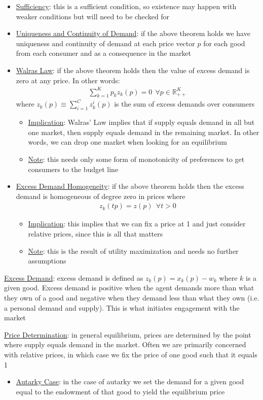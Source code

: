 \documentclass{article}
\begin{document}
  \begin{itemize}
    \item  \underline{Sufficiency}: this is a sufficient condition, so existence may happen with weaker conditions but will need to be checked for
    \item  \underline{Uniqueness and Continuity of Demand}: if the above theorem holds we have uniqueness and continuity of demand at each price vector $p$ for each good from each consumer and as a consequence in the market
    \item  \underline{Walras Law}: if the above theorem holds then the value of excess demand is zero at any price. In other words:
    \begin{gather*}
      \sum_{k=1}^{K} p_{k}z_{k}(p) = 0 \ \ \forall p \in \mathbb{R}_{++}^{K}
    \end{gather*}
    where $z_{k}(p) \equiv \sum_{i=1}^{C}z_{k}^{i}(p)$ is the sum of excess demands over consumers
    \begin{itemize}
      \item  \underline{Implication}: Walras' Law implies that if supply equals demand in all but one market, then supply equals demand in the remaining market. In other words, we can drop one market when looking for an equilibrium
      \item  \underline{Note}: this needs only some form of monotonicity of preferences to get consumers to the budget line
    \end{itemize}
    \item  \underline{Excess Demand Homogeneity}: if the above theorem holds then the excess demand is homogeneous of degree zero in prices where
    \begin{gather*}
      z_{k}(tp) = z(p) \ \ \forall t > 0
    \end{gather*}
    \begin{itemize}
      \item  \underline{Implication}: this implies that we can fix a price at 1 and just consider relative prices, since this is all that matters
      \item  \underline{Note}: this is the result of utility maximization and needs no further assumptions
    \end{itemize}
  \end{itemize}
  \underline{Excess Demand}: excess demand is defined as $z_{k}(p) = x_{k}(p) - w_{k}$ where $k$ is a given good. Excess demand is positive when the agent demands more than what they own of a good and negative when they demand less than what they own (i.e. a personal demand and supply). This is what initiates engagement with the market
  \par
  \underline{Price Determination}: in general equilibrium, prices are determined by the point where supply equals demand in the market. Often we are primarily concerned with relative prices, in which case we fix the price of one good such that it equals 1
  \begin{itemize}
    \item  \underline{Autarky Case}: in the case of autarky we set the demand for a given good equal to the endowment of that good to yield the equilibrium price
  \end{itemize}
  \par
\end{document}
